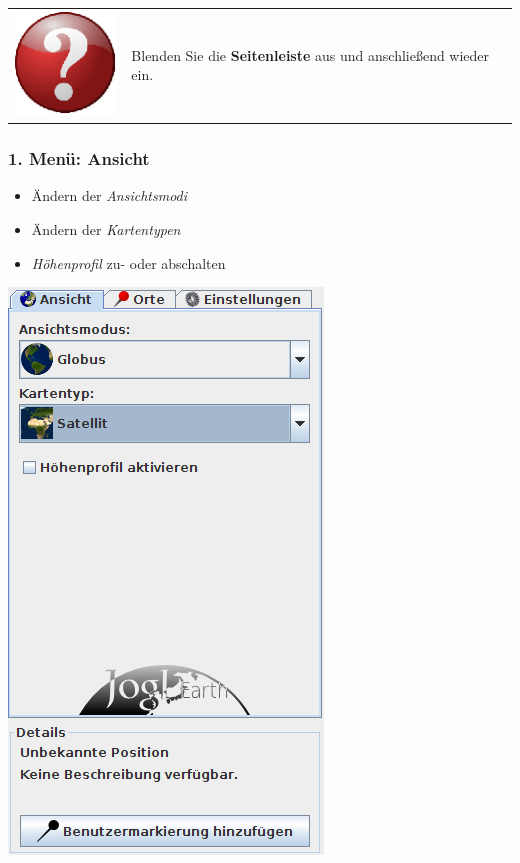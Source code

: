 \documentclass[10pt]{scrreprt}
\newcommand{\textref}[1]{\mbox{\raisebox{0.1ex}{\small$\rightarrow$ }\textit{#1}}}
\begin{document}
\vspace{3mm}
\begin{tabular}{>{\centering \arraybackslash}m{1cm} m{14cm}} \index{Benutzeroberfläche!Seitenleiste} \index{Seitenleiste}
\includegraphics[scale=0.5]{images/quest.eps} & Blenden Sie die \textbf{Seitenleiste} aus und anschließend wieder ein.
\end{tabular}


\vspace{10mm}
\begin{minipage}[t]{9cm}
\vspace{-40mm}
\subsubsection{1. Menü: Ansicht}  
	\begin{itemize}
	\item Ändern der \textref{Ansichtsmodi} 
	\item Ändern der \textref{Kartentypen} 
	\item \textref{Höhenprofil} zu- oder abschalten 
	\end{itemize}
\end{minipage}
\begin{minipage}{7cm}
\centering
\includegraphics[scale=0.4]{images/anzeige_tab.png}
\end{minipage}
\end{document}
